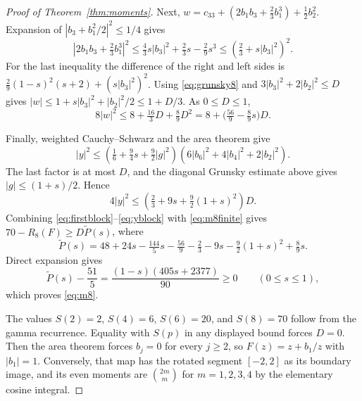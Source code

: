 \documentclass[11pt]{article}
\begin{document}
\begin{proof}[Proof of Theorem~\ref{thm:moments}]
		Next, $w=c_{33}+(2b_1b_3+\frac23b_1^3)+\frac12b_2^2$.
		Expansion of $|b_3+b_1^2/2|^2\le1/4$ gives
		\[
		|2b_1b_3+\tfrac23b_1^3|^2
		\le\tfrac43s|b_3|^2+\tfrac23s-\tfrac29s^3
		\le(\tfrac23+s|b_3|^2)^2.
		\]
		For the last inequality the difference of the right and left sides
		is $\frac29(1-s)^2(s+2)+(s|b_3|^2)^2$.
		Using \eqref{eq:grunsky8} and
		$3|b_3|^2+2|b_2|^2\le D$ gives
		$|w|\le1+s|b_3|^2+|b_2|^2/2\le1+D/3$.
		As $0\le D\le1$,
		\begin{equation}\label{eq:wblock}
			8|w|^2\le8+\tfrac{16}{3}D+\tfrac89D^2
			=8+\bigl(\tfrac{56}{9}-\tfrac89s\bigr)D.
		\end{equation}
		
		Finally, weighted Cauchy--Schwarz and the area theorem give
		\[
		|y|^2\le
		\left(\tfrac16+\tfrac94s+\tfrac92|g|^2\right)
		(6|b_6|^2+4|b_4|^2+2|b_2|^2).
		\]
		The last factor is at most $D$, and the diagonal Grunsky estimate
		above gives $|g|\le(1+s)/2$. Hence
		\begin{equation}\label{eq:yblock}
			4|y|^2\le
			\left(\tfrac23+9s+\tfrac92(1+s)^2\right)D.
		\end{equation}
		Combining \eqref{eq:firstblock}--\eqref{eq:yblock} with
		\eqref{eq:m8finite} gives $70-R_8(F)\ge D\widetilde P(s)$, where
		\[
		\widetilde P(s)=48+24s-\tfrac{144}{5}s-\tfrac{56}{9}
		-\tfrac23-9s-\tfrac92(1+s)^2+\tfrac89s.
		\]
		Direct expansion gives
		\[
		\widetilde P(s)-\frac{51}{5}
		=\frac{(1-s)(405s+2377)}{90}\ge0\qquad(0\le s\le1),
		\]
		which proves \eqref{eq:m8}.
		
		The values $S(2)=2$, $S(4)=6$, $S(6)=20$, and $S(8)=70$ follow from the gamma
		recurrence. Equality with $S(p)$ in any displayed bound forces $D=0$.
		Then the area theorem forces $b_j=0$ for every $j\ge2$, so
		$F(z)=z+b_1/z$ with $|b_1|=1$. Conversely, that map has the rotated
		segment $[-2,2]$ as its boundary image, and its even moments are
		$\binom{2m}{m}$ for $m=1,2,3,4$ by the elementary cosine integral.
	\end{proof}
	
\end{document}
